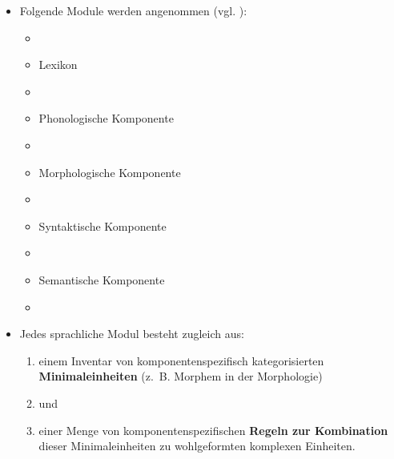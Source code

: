\begin{frame}

\begin{itemize}
	\item Folgende Module werden angenommen (vgl. \citet{Abramowski2016a}):
		
	\begin{itemize}
		\item[]
		\item Lexikon
		\item[]
		\item Phonologische Komponente
		\item[]
		\item Morphologische Komponente
		\item[]
		\item Syntaktische Komponente
		\item[]
		\item Semantische Komponente
		\item[]
	\end{itemize}
		
	\item<2-> Jedes sprachliche Modul besteht zugleich aus:
	
	\begin{enumerate}
		\item<2-> einem Inventar von komponentenspezifisch kategorisierten \textbf{Minimaleinheiten} (z.~B. Morphem in der Morphologie)
		\item<2->[] und
		\item<2-> einer Menge von komponentenspezifischen \textbf{Regeln zur Kombination} dieser Minimaleinheiten zu wohlgeformten komplexen Einheiten. 
	\end{enumerate}		  
		
\end{itemize}

\end{frame}


%
%

